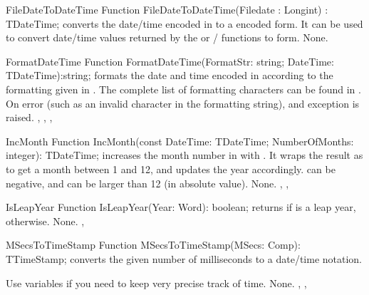 


\begin{function}{FileDateToDateTime}
\Declaration
Function FileDateToDateTime(Filedate : Longint) : TDateTime;
\Description
{} converts the date/time encoded in 
to a  encoded form. It can be used to convert date/time values
returned by the  or /
functions to  form.
\Errors
None.
\SeeAlso
{}
\end{function}



\begin{function}{FormatDateTime}
\Declaration
Function FormatDateTime(FormatStr: string; DateTime: TDateTime):string;
\Description
{} formats the date and time encoded in 
according to the formatting given in . The complete list
of formatting characters can be found in .
\Errors
On error (such as an invalid character in the formatting string), and
 exception is raised.
\SeeAlso
{}, , ,
\end{function}




\begin{function}{IncMonth}
\Declaration
Function IncMonth(const DateTime: TDateTime; NumberOfMonths: integer): TDateTime;
\Description
{} increases the month number in  with
. It wraps the result as to get a month between 1 and
12, and updates the year accordingly.  can be negative,
and can be larger than 12 (in absolute value).
\Errors
None.
\SeeAlso
{}, , 
\end{function}




\begin{function}{IsLeapYear}
\Declaration
Function IsLeapYear(Year: Word): boolean;
\Description
{} returns  if  is a leap year,
 otherwise.
\Errors
None.
\SeeAlso
{}, 
\end{function}



\begin{function}{MSecsToTimeStamp}
\Declaration
Function MSecsToTimeStamp(MSecs: Comp): TTimeStamp;
\Description
{} converts the given number of milliseconds to
a  date/time notation.

Use  variables if you need to keep very precise track of
time.
\Errors
None.
\SeeAlso
{}, ,
\end{function}

